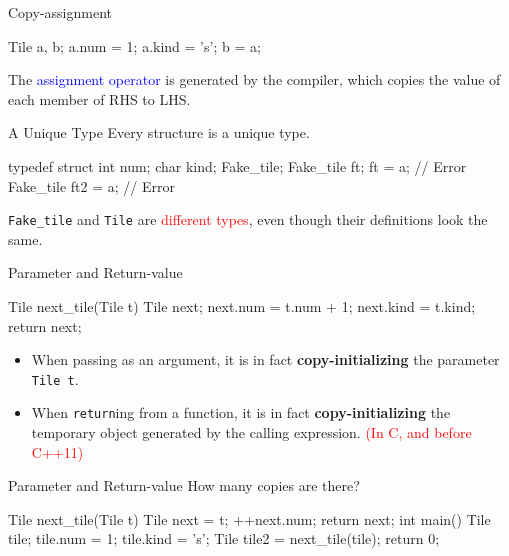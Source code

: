\documentclass{beamer}
\newcommand{\red}[1]{\textcolor{red}{#1}}
\newcommand{\blue}[1]{\textcolor{blue}{#1}}
\newcommand{\ttt}[1]{\texttt{#1}}
\theoremstyle{definition}
\begin{document}
\begin{frame}[fragile]{Copy-assignment}
    \begin{cpp}
Tile a, b;
a.num = 1; a.kind = 's';
b = a;
    \end{cpp}
    The \blue{assignment operator} is generated by the compiler, which copies the value of each member of RHS to LHS.
\end{frame}

\begin{frame}[fragile]{A Unique Type}
    Every structure is a unique type.
    \pause
    \begin{cpp}
typedef struct {
  int num;
  char kind;
} Fake_tile;
Fake_tile ft;
ft = a;             // Error
Fake_tile ft2 = a;  // Error
    \end{cpp}
    \ttt{Fake\_tile} and \ttt{Tile} are \red{different types}, even though their definitions look the same.
\end{frame}

\begin{frame}[fragile]{Parameter and Return-value}
    \begin{cpp}
Tile next_tile(Tile t) {
  Tile next;
  next.num = t.num + 1;
  next.kind = t.kind;
  return next;
}
    \end{cpp}
    \pause
    \begin{itemize}
        \item When passing as an argument, it is in fact \textbf{copy-initializing} the parameter \ttt{Tile t}.
        \item When \ttt{return}ing from a function, it is in fact \textbf{copy-initializing} the temporary object generated by the calling expression. \red{(In C, and before C++11)}
    \end{itemize}
\end{frame}

\begin{frame}[fragile]{Parameter and Return-value}
    How many copies are there?
    \begin{cpp}
Tile next_tile(Tile t) {
  Tile next = t;
  ++next.num;
  return next;
}
int main() {
  Tile tile;
  tile.num = 1;
  tile.kind = 's';
  Tile tile2 = next_tile(tile);
  return 0;
}
    \end{cpp}
\end{frame}
\end{document}
